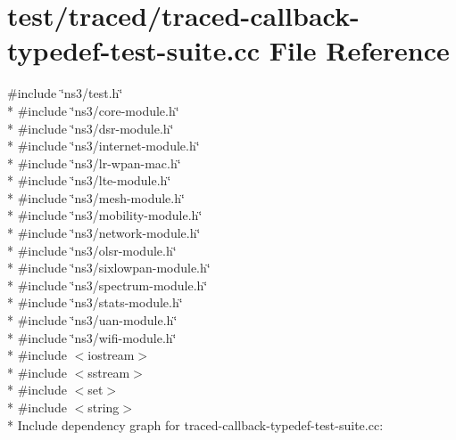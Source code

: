 \hypertarget{traced-callback-typedef-test-suite_8cc}{}\section{test/traced/traced-\/callback-\/typedef-\/test-\/suite.cc File Reference}
\label{traced-callback-typedef-test-suite_8cc}
{\ttfamily \#include \char`\"{}ns3/test.\+h\char`\"{}}\\*
{\ttfamily \#include \char`\"{}ns3/core-\/module.\+h\char`\"{}}\\*
{\ttfamily \#include \char`\"{}ns3/dsr-\/module.\+h\char`\"{}}\\*
{\ttfamily \#include \char`\"{}ns3/internet-\/module.\+h\char`\"{}}\\*
{\ttfamily \#include \char`\"{}ns3/lr-\/wpan-\/mac.\+h\char`\"{}}\\*
{\ttfamily \#include \char`\"{}ns3/lte-\/module.\+h\char`\"{}}\\*
{\ttfamily \#include \char`\"{}ns3/mesh-\/module.\+h\char`\"{}}\\*
{\ttfamily \#include \char`\"{}ns3/mobility-\/module.\+h\char`\"{}}\\*
{\ttfamily \#include \char`\"{}ns3/network-\/module.\+h\char`\"{}}\\*
{\ttfamily \#include \char`\"{}ns3/olsr-\/module.\+h\char`\"{}}\\*
{\ttfamily \#include \char`\"{}ns3/sixlowpan-\/module.\+h\char`\"{}}\\*
{\ttfamily \#include \char`\"{}ns3/spectrum-\/module.\+h\char`\"{}}\\*
{\ttfamily \#include \char`\"{}ns3/stats-\/module.\+h\char`\"{}}\\*
{\ttfamily \#include \char`\"{}ns3/uan-\/module.\+h\char`\"{}}\\*
{\ttfamily \#include \char`\"{}ns3/wifi-\/module.\+h\char`\"{}}\\*
{\ttfamily \#include $<$iostream$>$}\\*
{\ttfamily \#include $<$sstream$>$}\\*
{\ttfamily \#include $<$set$>$}\\*
{\ttfamily \#include $<$string$>$}\\*
Include dependency graph for traced-\/callback-\/typedef-\/test-\/suite.cc\+:
